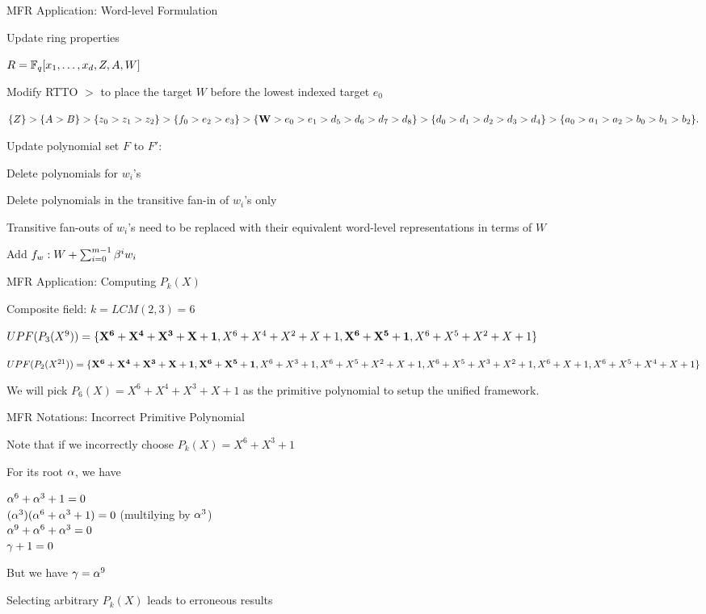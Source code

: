 \begin{frame}{\large MFR Application: Word-level Formulation}
\bi
	\item Update ring properties 
	\bi
		\item $R={\mathbb{F}}_q[x_1,\dots,x_d,Z,A,W]$
		\item Modify RTTO $>$ to place the target $W$ before the lowest indexed target $e_0$
		\bi
			\item $\{Z\}>\{A>B\}>\{z_0>z_1>z_2\}>\{f_0>e_2>e_3\}>\{{\bf{W}}>e_0>e_1>d_5>d_6>d_7>d_8\}>
				\{d_0>d_1>d_2>d_3>d_4\}>\{a_0>a_1>a_2>b_0>b_1>b_2\}.$
		\ei
	\ei
	\vspace{0.1in}
	\item Update polynomial set $F$ to $F'$:
	\bi
		\item Delete polynomials for $w_i$'s
		\item Delete polynomials in the transitive fan-in of $w_i$'s only
		\item Transitive fan-outs of $w_i$'s need to be replaced with their equivalent 
		word-level representations in terms of $W$
		\item Add $f_w: W + \sum_{i=0}^{m-1}\beta^iw_i$
	\ei

\ei
\end{frame}

\begin{frame}{\large MFR Application: Computing $P_k(X)$}
\bi
	\item Composite field: $k=LCM(2,3)=6$
	\vspace{0.1in}
	\bi
		\item $UPF(P_3(X^9)) = \{{\bf X^6+X^4+X^3+X+1},X^6+X^4+X^2+X+1,{\bf X^6+X^5+1}, X^6+X^5+X^2+X+1\}$
		\vspace{0.1in}
		\item $UPF(P_2(X^{21})) = \{{\bf X^6+X^4+X^3+X+1}, {\bf X^6+X^5+1}, X^6+X^3+1, X^6+X^5+X^2+X+1, X^6+X^5+X^3+X^2+1, X^6+X+1, X^6+X^5+X^4+X+1 \}$
		\vspace{0.1in}
		\item We will pick $P_6(X)=X^6+X^4+X^3+X+1$ as the primitive polynomial to setup the unified framework.
	\ei
\ei
\end{frame}

\begin{frame}{\large MFR Notations: Incorrect Primitive Polynomial}
\bi
	\item Note that if we incorrectly choose $P_k(X)=X^6+X^3+1$
	\item For its root $\alpha$, we have
	\begin{center}
		$\alpha^6+\alpha^3+1=0$\\
		$(\alpha^3)(\alpha^6+\alpha^3+1)=0$ (multilying by $\alpha^3$)\\
		$\alpha^9+\alpha^6+\alpha^3=0$\\
		$\gamma+1=0$\label{ga_val}
	\end{center}
	\item But we have $\gamma=\alpha^9$
	\item Selecting arbitrary $P_k(X)$ leads to erroneous results
\ei
\end{frame}

